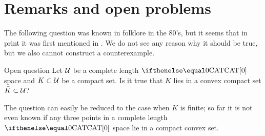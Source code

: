 \section{Remarks and open problems}






The following question was known in folklore in the 80's,
but it seems that in print
it was first mentioned in \cite{kopecka-reich}. %
We do not see any reason why it should be true, 
but we also cannot construct a counterexample.

\begin{thm}{Open question}
Let $\mathcal{U}$ be a complete length $\CAT0$ space and $K\subset \spc{U}$ be a compact set.
Is it true that $K$ lies in a convex compact set $\bar K\subset\spc{U}$?
\end{thm}

The question can  easily be reduced to the case when $K$ is finite;
so far it is not even known if any three points in a complete length $\CAT0$ space lie in a compact convex set.















